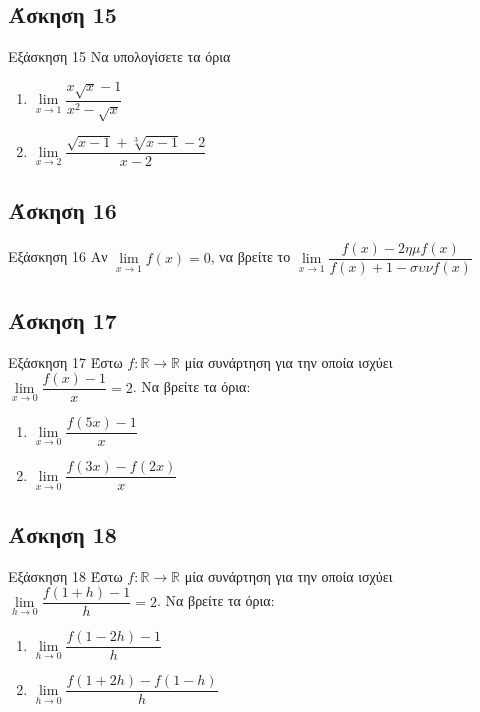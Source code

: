 \documentclass[greek]{beamer}
\begin{document}
\subsection{Άσκηση 15}
\begin{frame}[label=Άσκηση15,t]{Εξάσκηση 15}
  Να υπολογίσετε τα όρια
  \begin{enumerate}
    \item $\lim\limits_{x \to 1}{ \dfrac{x\sqrt{x}-1}{x^2-\sqrt{x}} }$ \pause
    \item $\lim\limits_{x \to 2}{ \dfrac{\sqrt{x-1}+\sqrt[3]{x-1}-2}{x-2} }$
  \end{enumerate}

\end{frame}

\subsection{Άσκηση 16}
\begin{frame}[label=Άσκηση16,t]{Εξάσκηση 16}
  Αν $\lim\limits_{x \to 1}{ f(x) }=0$, να βρείτε το $\lim\limits_{x \to 1}{ \dfrac{f(x)-2ημf(x)}{f(x)+1-συνf(x)} }$

\end{frame}

\subsection{Άσκηση 17}
\begin{frame}[label=Άσκηση17,t]{Εξάσκηση 17}
  Έστω $f:\mathbb{R}\to\mathbb{R}$ μία συνάρτηση για την οποία ισχύει $\lim\limits_{x \to 0}{ \dfrac{f(x)-1}{x} }=2$. Να βρείτε τα όρια:
  \begin{enumerate}
    \item $\lim\limits_{x \to 0}{ \dfrac{f(5x)-1}{x} }$ \pause
    \item $\lim\limits_{x \to 0}{ \dfrac{f(3x)-f(2x)}{x} }$
  \end{enumerate}

\end{frame}

\subsection{Άσκηση 18}
\begin{frame}[label=Άσκηση18,t]{Εξάσκηση 18}
  Έστω $f:\mathbb{R}\to\mathbb{R}$ μία συνάρτηση για την οποία ισχύει $\lim\limits_{h \to 0}{ \dfrac{f(1+h)-1}{h} }=2$. Να βρείτε τα όρια:
  \begin{enumerate}
    \item $\lim\limits_{h \to 0}{ \dfrac{f(1-2h)-1}{h} }$ \pause
    \item $\lim\limits_{h \to 0}{ \dfrac{f(1+2h)-f(1-h)}{h} }$
  \end{enumerate}

\end{frame}
\end{document}
